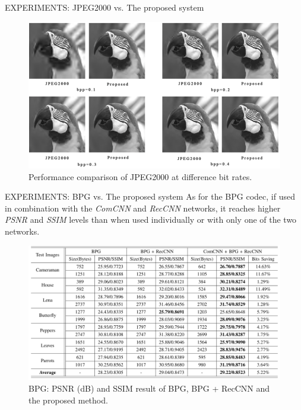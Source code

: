 \documentclass[10pt]{beamer}
\begin{document}
\begin{frame}{EXPERIMENTS: JPEG2000 vs. The proposed system}
\begin{minipage}{\linewidth}
\begin{minipage}{0.45\linewidth}
            \begin{figure}[htbp]
                \centering
                \includegraphics[width = 1 \linewidth]{images/paper3/JPEG2000p.png}
                \caption{Performance comparison of JPEG2000 at difference bit rates.}
                \label{fig:parrot}
                \centering
            \end{figure}
        \end{minipage}
    \end{minipage}
\end{frame}

\begin{frame}{EXPERIMENTS: BPG vs. The proposed system}
    As for the BPG codec, if used in combination with the \emph{ComCNN} and 
    \emph{RecCNN} networks, it reaches higher \emph{PSNR} and \emph{SSIM} levels than when 
    used individually or with only one of the two networks.   
    \begin{figure}[htbp]
        \centering
        \includegraphics[width = 1 \linewidth]{images/paper3/BPG.png}
        \centering
        \caption{BPG: PSNR (dB) and SSIM result of BPG, BPG + RecCNN and the proposed method.}
        \label{fig:BPG}
    \end{figure}
\end{frame}
\end{document}
